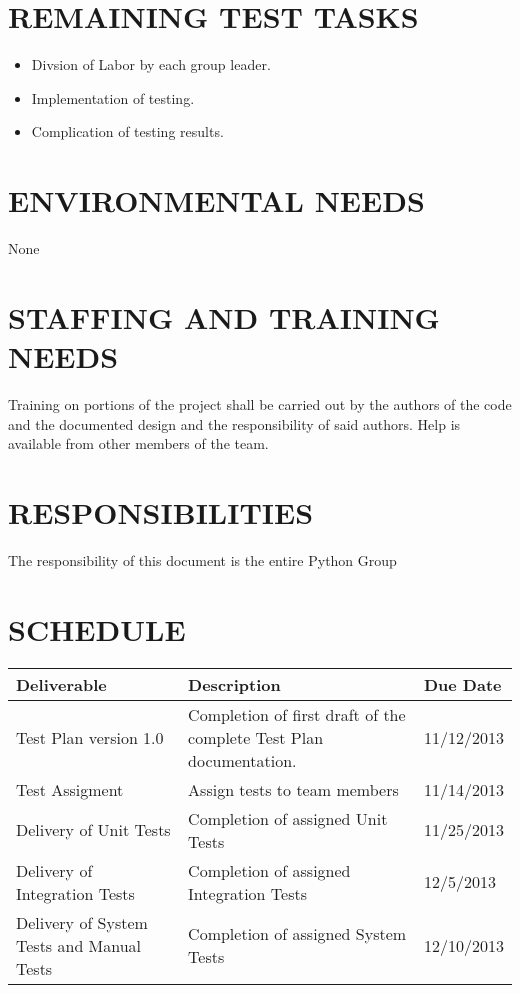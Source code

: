\documentclass[report]{article}
\begin{document}
\section[REMAINING TEST TASKS]{REMAINING TEST TASKS}
\begin{itemize}
\item Divsion of Labor by each group leader.
\item Implementation of testing.
\item Complication of testing results.
\end{itemize}

\section[EVIRONMENTAL NEEDS]{ENVIRONMENTAL NEEDS}
None

\section[STAFFING AND TRAINING NEEDS]{STAFFING AND TRAINING NEEDS}
Training on portions of the project shall be carried out by the authors of the code and the documented design and the responsibility of said authors. Help is available from other members of the team.


\section[RESPONSIBILITIES]{RESPONSIBILITIES}
The responsibility of this document is the entire Python Group


\section[SCHEDULE]{SCHEDULE}
\begin{center}
\begin{tabularx}{\textwidth}{| X | X | X |}
  \hline
  \textbf{Deliverable} &
  \textbf{Description} &
  \textbf{Due Date} 
\\ \hline
Test Plan version 1.0 & 
Completion of first draft of the complete Test Plan documentation. &
11/12/2013
\\ \hline

Test Assigment &
Assign tests to team members &
11/14/2013
\\ \hline

Delivery of Unit Tests &
Completion of assigned Unit Tests &
11/25/2013
\\ \hline

Delivery of Integration Tests &
Completion of assigned Integration Tests &
12/5/2013
\\ \hline

Delivery of System Tests and Manual Tests &
Completion of assigned System Tests &
12/10/2013
\\ \hline

\end{tabularx}
\end{center}
\end{document}
